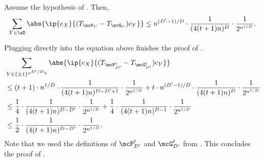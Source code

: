 \begin{lemma}
    \label{lem:genrowreduced}
    Assume the hypothesis of . Then,
    \begin{align*}
        \sum_{Y \in \sD} \abs{\ip{e_X}{(T_{\mcP_C}-T_{\mcG_C}) e_Y}} \leq n^{(D'-1)/D}\cdot \frac1{(4(t+1)n)^D}\cdot \frac1{2^{n^{1/D}}}.
    \end{align*}
\end{lemma}
Plugging directly into the equation above finishes the proof of .
\begin{align*}
     &\sum_{Y \in \{\pm1\}^{n^{D'/D}k}} \abs{\ip{e_X}{(T_{\mcP_{D'}^t}-T_{\mcG^t_{D'}}) e_Y}}\\
     &\leq(t+1)\cdot n^{1/D}\cdot \frac{1}{(4(t+1)n)^{D-D'+1}}\cdot \frac1{2^{n^{1/D}}}+ t\cdot n^{(D'-1)/D}\cdot \frac1{(4(t+1)n)^D}\cdot \frac1{2^{n^{1/D}}}\\
     &\leq \frac14\cdot\frac1{(4(t+1)n)^{D-D'}}\cdot\frac1{2^{n^{1/D}}}+\frac14\cdot\frac1{(4(t+1)n)^{D-1}}\cdot\frac1{2^{n^{1/D}}}\\
     &\leq \frac12\cdot\frac1{(4(t+1)n)^{D-D'}}\cdot\frac1{2^{n^{1/D}}}.
\end{align*}
Note that we used the definitions of $\mcP_{D'}^t$ and $\mcG_{D'}^t$ from . This concludes the proof of .

